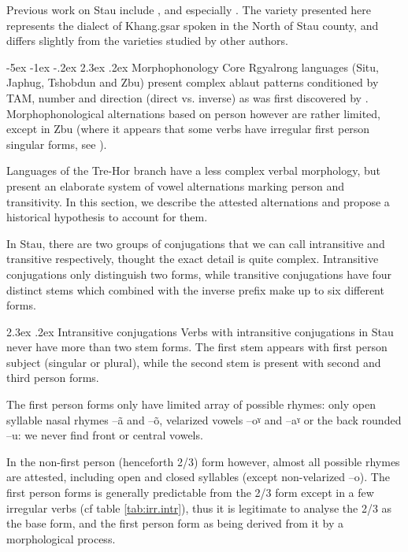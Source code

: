 \documentclass[oldfontcommands,twoside,usletter,12pt]{memoir}
\makeatletter
\newcommand{\ipa}[1]{{\phon #1}} %
\renewcommand\section{\@startsection{section}{0}{\z@}%
                                   {-5ex \@plus -1ex \@minus -.2ex}%
                                   {2.3ex \@plus.2ex}%
                                   {\flushleft\large\bfseries}}
\renewcommand{\subsection}{\@startsection{subsection}{1}{\z@}
                                   {-2.5ex \@plus -1ex \@minus -.2ex}%
                                   {2.3ex \@plus.2ex}%
								{\flushleft\large\itshape} }
\makeatother
\begin{document}
Previous work on Stau include \citet{huangbf91daofu}, \citet{jackson07shangzhai} and especially \citet{sun13gexi}. The variety presented here represents the dialect of Khang.gsar spoken in the North of Stau county, and differs slightly from the varieties studied by other authors.
 
\section{Morphophonology}
Core Rgyalrong languages (Situ, Japhug, Tshobdun and Zbu) present complex ablaut patterns conditioned by TAM, number and direction (direct vs. inverse) as was first discovered by  \citet{jackson00sidaba}.  Morphophonological alternations based on person however are rather limited, except in Zbu (where it appears that some verbs have irregular first person singular forms, see \citealt{gongxun14agreement}).

Languages of the Tre-Hor branch   have a less complex verbal morphology, but present an elaborate system of vowel alternations marking person and transitivity. In this section, we describe the attested alternations and propose a historical hypothesis to account for them.

In Stau, there are two groups of conjugations that we can call intransitive and transitive respectively, thought the exact detail is quite complex. Intransitive conjugations only distinguish two forms, while transitive conjugations have four distinct stems which combined with the inverse prefix make up to six different forms.
 
\subsection{Intransitive conjugations}
Verbs with intransitive conjugations in Stau never have more than two stem forms. The first stem appears with first person subject (singular or plural), while the second stem is present with second and third person forms.

The first person forms only have limited array of possible rhymes: only open syllable nasal rhymes --\ipa{ã} and --\ipa{õ}, velarized vowels --\ipa{oˠ} and --\ipa{aˠ} or the back rounded --\ipa{u}: we never find front or central vowels.

In the non-first person  (henceforth 2/3)  form however, almost all possible rhymes are attested, including open and closed syllables (except non-velarized --\ipa{o}). The first person forms is generally predictable from the 2/3 form except in a few irregular verbs (cf table \ref{tab:irr.intr}), thus it is legitimate to analyse the 2/3 as the base form, and the first person form as being derived from it by a morphological process.
 
\end{document}
